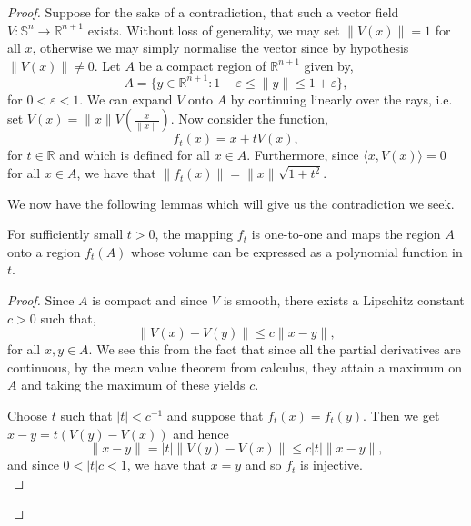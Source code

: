 \documentclass[12pt,a4paper]{article}
\begin{document}
\begin{proof}
Suppose for the sake of a contradiction, that such a vector field $V:\mathbb{S}^n\to\mathbb{R}^{n+1}$ exists. Without loss of generality, we may set $\|V(x)\|=1$ for all $x$, otherwise we may simply normalise the vector since by hypothesis $\|V(x)\|\neq 0$. Let $A$ be a compact region of $\mathbb{R}^{n+1}$ given by,
\[
A=\{y\in\mathbb{R}^{n+1}:1-\varepsilon\leq\|y\|\leq 1+\varepsilon\},
\] 
for $0<\varepsilon<1$. We can expand $V$ onto $A$ by continuing linearly over the rays, i.e. set $V(x)=\|x\|V(\frac{x}{\|x\|})$. Now consider the function,
\[
f_t(x)=x+tV(x),
\]
for $t\in\mathbb{R}$ and which is defined for all $x\in A$. Furthermore, since $\langle x,V(x)\rangle=0$ for all $x\in A$, we have that $\|f_t(x)\|=\|x\|\sqrt{1+t^2}$.

We now have the following lemmas which will give us the contradiction we seek.
\begin{lemma}
For sufficiently small $t>0$, the mapping $f_t$ is one-to-one and maps the region $A$ onto a region $f_t(A)$ whose volume can be expressed as a polynomial function in $t$.
\end{lemma}
\begin{proof}
Since $A$ is compact and since $V$ is smooth, there exists a Lipschitz constant $c>0$ such that,
\[
\|V(x)-V(y)\|\leq c\|x-y\|,
\]
for all $x,y\in A$. We see this from the fact that since all the partial derivatives are continuous, by the mean value theorem from calculus, they attain a maximum on $A$ and taking the maximum of these yields $c$.

Choose $t$ such that $|t|<c^{-1}$ and suppose that $f_t(x)=f_t(y)$. Then we get $x-y=t(V(y)-V(x))$ and hence \[\|x-y\|=|t|\|V(y)-V(x)\|\leq c|t|\|x-y\|,\] and since $0<|t|c<1$, we have that $x=y$ and so $f_t$ is injective.\\


\end{proof}
\end{proof}
\end{document}
